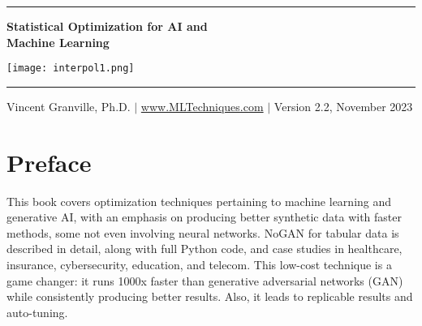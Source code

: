 \documentclass[oneside,10pt]{book}
\begin{document}
\hypersetup{linkcolor=blue}



\baselineskip
\thispagestyle{empty}
\hspace{0pt}
\vfill
\begin{center}
\rule{0.90\textwidth}{.4pt}
\end{center}

\begin{center}
{\Huge \bf{Statistical Optimization for AI and\\\vspace{0.5ex}Machine Learning} }
\end{center}


\baselineskip
\addvspace{1cm}
\begin{center}
\texttt{[image: interpol1.png]}
\end{center}
\addvspace{1cm}
\begin{center}
\rule{0.90\textwidth}{.4pt}
\end{center}
\begin{center}
Vincent Granville, Ph.D. $|$ \href{https://mltechniques.com/}{www.MLTechniques.com} $|$ Version 2.2, November 2023
\end{center}

\hypersetup{linkcolor=red} %

\vfill
\hspace{0pt}
\pagebreak

\chapter*{Preface} %

This book covers
 optimization techniques pertaining to machine learning and generative AI, with an emphasis on producing better synthetic data with faster methods, some not even involving neural networks. NoGAN for tabular data is described in detail, along with full Python code, and case studies in healthcare, insurance, cybersecurity, education, and telecom. This low-cost technique is a game changer: it runs 1000x faster than generative adversarial networks (GAN) while consistently producing better results. Also, it leads to replicable results and auto-tuning.
\end{document}
